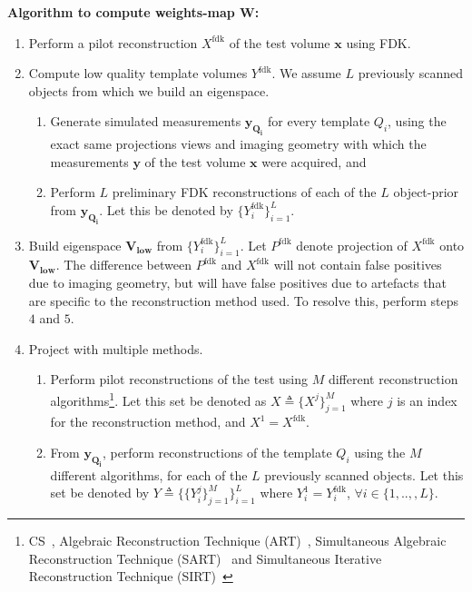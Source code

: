 \documentclass[journal]{IEEEtran}
\begin{document}
\textbf{Algorithm to compute weights-map $\boldsymbol{W}$:}
\label{sec:thealgo}
\begin{enumerate}

\item Perform a pilot reconstruction $X^{\text{fdk}}$ of the
  test volume $\boldsymbol{x}$ using FDK.

\item Compute low quality template volumes $Y^\text{fdk}$. 
We assume $L$ previously scanned objects from which we build
an eigenspace. 
\vspace{-0.1cm}

\begin{enumerate}
  \item Generate simulated measurements $\boldsymbol{y_{Q_i}}$ for
    every template $Q_i$, using the exact same projections views and
    imaging geometry with which the measurements $\boldsymbol{y}$ of
    the test volume $\boldsymbol{x}$ were acquired, and
\item Perform $L$ preliminary FDK reconstructions of each of the $L$
  object-prior from $\boldsymbol{y_{Q_i}}$.  Let this be denoted by
  $\{Y^{\text{fdk}}_i\}_{i=1}^L$.
  \end{enumerate}
\item Build eigenspace $\boldsymbol{V_{\text{low}}}$ from
  $\{Y^{\text{fdk}}_i\}_{i=1}^L$.  Let $P^{\text{fdk}}$ denote
  projection of $X^{\text{fdk}}$ onto
  $\boldsymbol{V_{\text{low}}}$. The difference between
  $P^{\text{fdk}}$ and $X^{\text{fdk}}$ will not contain false
  positives due to imaging geometry, but will have false positives due
  to artefacts that are specific to the reconstruction method used. To
  resolve this, perform steps $4$ and $5$.
\item Project with multiple methods.
  \begin{enumerate}
  \item Perform pilot reconstructions of the test using $M$ different
    reconstruction algorithms\footnote{CS~\cite{lasso}, Algebraic Reconstruction Technique (ART)~\cite{art},
     Simultaneous Algebraic Reconstruction Technique (SART)~\cite{sart} and  Simultaneous Iterative Reconstruction Technique (SIRT)~\cite{sirt}}. Let this set be denoted
    as $X \triangleq \{X^j\}_{j=1}^M$ where $j$ is an index for the
    reconstruction method, and $X^1 = X^{\text{fdk}}$. 

  \item From $\boldsymbol{y_{Q_i}}$, perform reconstructions of the template $Q_i$ using the $M$ different algorithms, for each of the $L$ previously scanned objects. Let this set be denoted by $Y \triangleq \{\{Y_{i}^j\}_{j=1}^M\}_{i=1}^L$ where $Y^{1}_i = Y^{\text{fdk}}_i$, $\forall i \in \{1,..,,L\}$.



\end{enumerate}
\end{enumerate}
\end{document}
